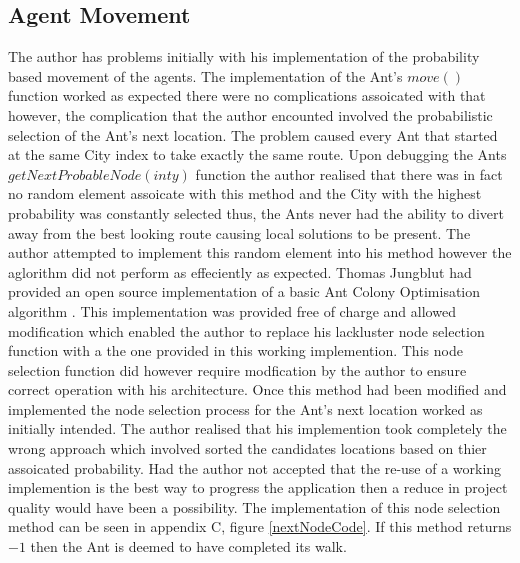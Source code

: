 \subsection{Agent Movement}
\label{antyMove}
The author has problems initially with his implementation of the probability based movement of the agents. The implementation of the Ant's $move()$ function worked as expected there were no complications assoicated with that however, the complication that the author encounted involved the probabilistic selection of the Ant's next location. The problem caused every Ant that started at the same City index to take exactly the same route. Upon debugging the Ants $getNextProbableNode(int y)$ function the author realised that there was in fact no random element assoicate with this method and the City with the highest probability was constantly selected thus, the Ants never had the ability to divert away from the best looking route causing local solutions to be present. The author attempted to implement this random element into his method however the aglorithm did not perform as effeciently as expected. Thomas Jungblut had provided an open source implementation of a basic Ant Colony Optimisation algorithm \cite{tjung:aco:blog}. This implementation was provided free of charge and allowed modification which enabled the author to replace his lackluster node selection function with a the one provided in this working implemention. This node selection function did however require modfication by the author to ensure correct operation with his architecture. Once this method had been modified and implemented the node selection process for the Ant's next location worked as initially intended. The author realised that his implemention took completely the wrong approach which involved sorted the candidates locations based on thier assoicated probability. Had the author not accepted that the re-use of a working implemention is the best way to progress the application then a reduce in project quality would have been a possibility.  The implementation of this node selection method can be seen in appendix C, figure \ref{nextNodeCode}. If this method returns $-1$ then the Ant is deemed to have completed its walk.

